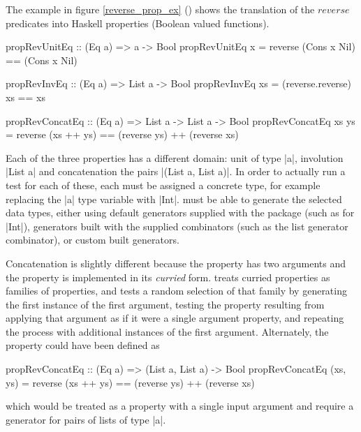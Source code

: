 The example in figure \ref{reverse_prop_ex}  (\cite{Claessen2000}) shows 
the translation of the $reverse$ predicates
into Haskell properties (Boolean valued functions).

\begin{figure*}
\begin{code}
propRevUnitEq :: (Eq a) => a -> Bool
propRevUnitEq x = reverse (Cons x Nil) == (Cons x Nil)

propRevInvEq :: (Eq a) => List a -> Bool
propRevInvEq xs = (reverse.reverse) xs == xs

propRevConcatEq :: (Eq a) => List a ->  List a -> Bool
propRevConcatEq xs ys = reverse (xs ++ ys) == (reverse ys) ++ (reverse xs)
\end{code}
\caption[Haskell properties for the reverse function.]
{The Haskell properties of a reverse function for the polymorphic list.}
\label{reverse_prop_ex}
\end{figure*}

\noindent
Each of the three properties has a different domain:
unit of type |a|, involution |List a| and concatenation the pairs |(List a, List a)|.
In order to actually run a test for each of these, 
each must be assigned a concrete type,
for example replacing the |a| type variable with |Int|.
\QC must be able to generate the selected data types,
either using default generators supplied with the package (such as for |Int|),
generators built with the supplied combinators (such as the list generator combinator),
or custom built generators.

Concatenation is slightly different because
the property has two arguments and the property is implemented in its \emph{curried} form.
\QC treats curried properties as families of properties,
and tests a random selection of that family by
generating the first instance of the first argument, 
testing the property resulting from applying that argument as if it were a single argument property,
and repeating the process with additional instances of the first argument.
Alternately, the property could have been defined as

\begin{code}
propRevConcatEq :: (Eq a) => (List a, List a) -> Bool
propRevConcatEq (xs, ys) = reverse (xs ++ ys) == (reverse ys) ++ (reverse xs)
\end{code}

\noindent which would be treated as a property with a single input argument and 
require a generator for pairs of lists of type |a|.

